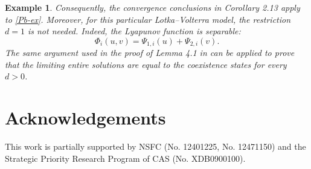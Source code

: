 \documentclass[10pt]{article}
\numberwithin{equation}{section}
\newtheorem{example}[theorem]{Example}
\begin{document}
\begin{example}
Consequently, the convergence conclusions in Corollary 2.13 apply to \eqref{Pb-ex}. Moreover, for this particular Lotka--Volterra model, the restriction \(d=1\) is not needed. Indeed, the Lyapunov function is separable:
\[
\Phi_i(u,v)=\Psi_{1,i}(u)+\Psi_{2,i}(v).
\]
The same argument used  in the proof of Lemma 4.1 in \cite{ducrot2021asymptotic}  can be applied to  prove that the limiting entire solutions are  equal to the coexistence states  for every $d>0$.
\end{example}




\section*{Acknowledgements}
This work  is partially supported by NSFC (No. 12401225, No. 12471150) and  the Strategic Priority Research Program of CAS (No. XDB0900100). 

\begin{small}
	
		
\end{small}





\end{document}
